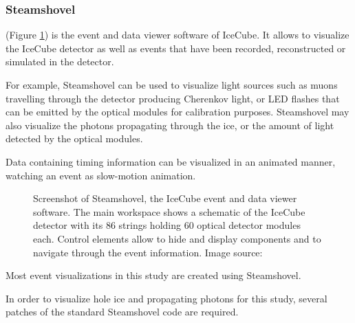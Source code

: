 



\subsubsection{Steamshovel}

 (Figure \ref{fig:steamshovel}) is the event and data viewer software of IceCube. It allows to visualize the IceCube detector as well as events that have been recorded, reconstructed or simulated in the detector.

For example, Steamshovel can be used to visualize light sources such as muons travelling through the detector producing Cherenkov light, or LED flashes that can be emitted by the optical modules for calibration purposes. Steamshovel may also visualize the photons propagating through the ice, or the amount of light detected by the optical modules.

Data containing timing information can be visualized in an animated manner, watching an event as slow-motion animation.

\begin{figure}
  \label{fig:steamshovel}
  \caption{Screenshot of Steamshovel, the IceCube event and data viewer software. The main workspace shows a schematic of the IceCube detector with its 86 strings holding 60 optical detector modules each. Control elements allow to hide and display components and to navigate through the event information. Image source: \cite{steamshoveldocumentation}}
\end{figure}

Most event visualizations in this study are created using Steamshovel.

In order to visualize hole ice and propagating photons for this study, several patches of the standard Steamshovel code are required.

